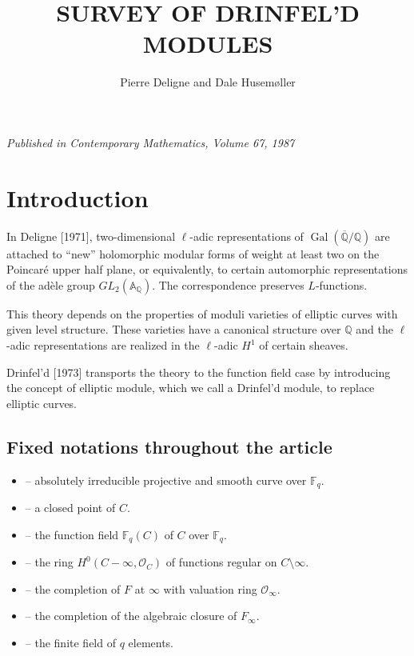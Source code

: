 \documentclass[12pt,a4paper]{article}
\title{\textbf{SURVEY OF DRINFEL'D MODULES}}
\author{Pierre Deligne and Dale Husem\o ller}
\date{}
\theoremstyle{plain}
\theoremstyle{definition}
\theoremstyle{remark}
\DeclareMathOperator{\Gal}{Gal}
\newcommand{\bF}{\mathbb{F}}
\newcommand{\bQ}{\mathbb{Q}}
\newcommand{\bA}{\mathbb{A}}
\newcommand{\cO}{\mathcal{O}}
\providecommand{\cO}{\mathcal{O}}
\providecommand{\Gal}{\operatorname{Gal}}
\begin{document}

\maketitle

\begin{center}
\textit{Published in Contemporary Mathematics, Volume 67, 1987}
\end{center}

\vspace{1cm}

\tableofcontents

\newpage

\section*{Introduction}

In Deligne [1971], two-dimensional $\ell$-adic representations of $\Gal(\overline{\bQ}/\bQ)$ are attached to ``new'' holomorphic modular forms of weight at least two on the Poincar\'e upper half plane, or equivalently, to certain automorphic representations of the ad\`ele group $GL_2(\bA_\bQ)$. The correspondence preserves $L$-functions.

This theory depends on the properties of moduli varieties of elliptic curves with given level structure. These varieties have a canonical structure over $\bQ$ and the $\ell$-adic representations are realized in the $\ell$-adic $H^1$ of certain sheaves.

Drinfel'd [1973] transports the theory to the function field case by introducing the concept of elliptic module, which we call a Drinfel'd module, to replace elliptic curves.

\subsection*{Fixed notations throughout the article}

\begin{itemize}[leftmargin=2cm]
\item[$C$] -- absolutely irreducible projective and smooth curve over $\bF_q$.
\item[$\infty$] -- a closed point of $C$.
\item[$F$] -- the function field $\bF_q(C)$ of $C$ over $\bF_q$.
\item[$A$] -- the ring $H^0(C - \infty, \cO_C)$ of functions regular on $C \setminus \infty$.
\item[$F_\infty$] -- the completion of $F$ at $\infty$ with valuation ring $\cO_\infty$.
\item[$C_\infty$] -- the completion of the algebraic closure of $F_\infty$.
\item[$\bF_q$] -- the finite field of $q$ elements.
\end{itemize}
\end{document}
